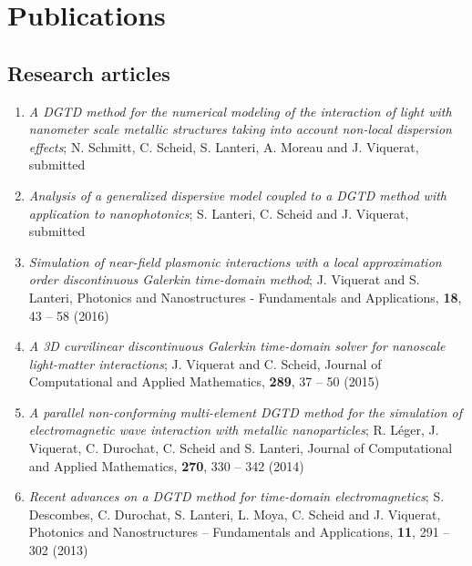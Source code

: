 \chapter*{Publications}

\section*{Research articles}

\begin{enumerate}
	\item \textit{A DGTD method for the numerical modeling of the interaction of light with nanometer scale metallic structures taking into account non-local dispersion effects}; N. Schmitt, C. Scheid, S. Lanteri, A. Moreau and J. Viquerat, submitted
	\item \textit{Analysis of a generalized dispersive model coupled to a DGTD method with application to nanophotonics}; S. Lanteri, C. Scheid and J. Viquerat, submitted
	\item \textit{Simulation of near-field plasmonic interactions with a local approximation order discontinuous Galerkin time-domain method}; J. Viquerat and S. Lanteri, Photonics and Nanostructures - Fundamentals and Applications, \textbf{18}, 43 -- 58 (2016)
	\item \textit{A 3D curvilinear discontinuous Galerkin time-domain solver for nanoscale light-matter interactions}; J. Viquerat and C. Scheid, Journal of Computational and Applied Mathematics, \textbf{289}, 37 -- 50 (2015)
	\item \textit{A parallel non-conforming multi-element DGTD method for the simulation of electromagnetic wave interaction with metallic nanoparticles}; R. L\'eger, J. Viquerat, C. Durochat, C. Scheid and S. Lanteri, Journal of Computational and Applied Mathematics, \textbf{270}, 330 -- 342 (2014)
	\item \textit{Recent advances on a DGTD method for time-domain electromagnetics}; S. Descombes, C. Durochat, S. Lanteri, L. Moya, C. Scheid and J. Viquerat, Photonics and Nanostructures -- Fundamentals and Applications, \textbf{11}, 291 -- 302 (2013)
\end{enumerate}


